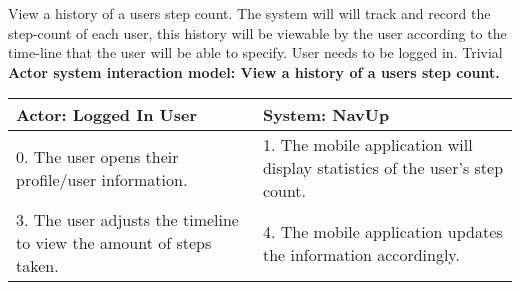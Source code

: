 \FuncReq
{View a history of a users step count.}
{The system will will track and record the step-count of each user, this history will be viewable by the user according to the time-line that the user will be able to specify.}
{User needs to be logged in.}
{Trivial}
\\
    \textbf{Actor system interaction model: View a history of a users step count. }\\
    \begin{tabular}{ | p{6cm} | p{6cm} |}
    \hline
    Actor: Logged In User & System: NavUp \\ \hline
    0. The user opens their profile/user information. & 1. The mobile application will display statistics of the user's step count.\\ \hline
    3. The user adjusts the timeline to view the amount of steps taken. & 4. The mobile application updates the information accordingly. \\ \hline
    \end{tabular}
\\
\bigskip
